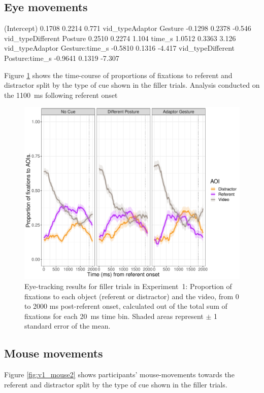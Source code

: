 \documentclass[a4paper,man,natbib]{apa6}
\begin{document}
\subsection{Eye movements}
(Intercept)                        0.1708     0.2214   0.771
vid_typeAdaptor Gesture           -0.1298     0.2378  -0.546
vid_typeDifferent Posture          0.2510     0.2274   1.104
time_s                             1.0512     0.3363   3.126
vid_typeAdaptor Gesture:time_s    -0.5810     0.1316  -4.417
vid_typeDifferent Posture:time_s  -0.9641     0.1319  -7.307

Figure \ref{fig:v1_eye2} shows the time-course of proportions of fixations to referent and distractor split by the type of cue shown in the filler trials. 
Analysis conducted on the 1100~ms following referent onset 
\begin{figure}[Ht]
  \centering
	\includegraphics[width=\linewidth]{./img/e7_fixations_filler.pdf}
  \caption{Eye-tracking results for filler trials in Experiment~1: Proportion of fixations to each object (referent or distractor) and the video, from 0 to 2000 ms post-referent onset, calculated out of the total sum of fixations for each 20~ms time bin. Shaded areas represent $\pm$ 1 standard error of the mean.}
  \label{fig:v1_eye2}
\end{figure}

\subsection{Mouse movements}
Figure \ref{fig:v1_mouse2} shows participants' mouse-movements towards the referent and distractor split by the type of cue shown in the filler trials. 
\end{document}
